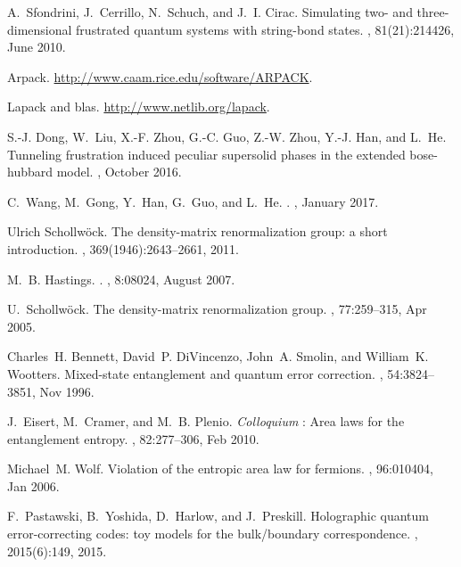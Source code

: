 \documentclass[preprint,3p,times,preprint,showpacs,amsmath,superscriptaddress,floatfix]{elsarticle}
\newcounter{bla}
\begin{document}
\begin{thebibliography}{10}
A.~{Sfondrini}, J.~{Cerrillo}, N.~{Schuch}, and J.~I. {Cirac}.
\newblock Simulating two- and three-dimensional frustrated quantum systems with
  string-bond states.
, 81(21):214426, June 2010.

Arpack.
\newblock \url{http://www.caam.rice.edu/software/ARPACK}.

Lapack and blas.
\newblock \url{http://www.netlib.org/lapack}.

S.-J. {Dong}, W.~{Liu}, X.-F. {Zhou}, G.-C. {Guo}, Z.-W. {Zhou}, Y.-J. {Han},
  and L.~{He}.
\newblock Tunneling frustration induced peculiar supersolid phases in the
  extended bose-hubbard model.
, October 2016.

C.~{Wang}, M.~{Gong}, Y.~{Han}, G.~{Guo}, and L.~{He}.
.
, January 2017.

Ulrich Schollw{\"o}ck.
\newblock The density-matrix renormalization group: a short introduction.
, 369(1946):2643--2661, 2011.

M.~B. {Hastings}.
.
,
  8:08024, August 2007.

U.~Schollw\"ock.
\newblock The density-matrix renormalization group.
, 77:259--315, Apr 2005.

Charles~H. Bennett, David~P. DiVincenzo, John~A. Smolin, and William~K.
  Wootters.
\newblock Mixed-state entanglement and quantum error correction.
, 54:3824--3851, Nov 1996.

J.~Eisert, M.~Cramer, and M.~B. Plenio.
\newblock \textit{Colloquium} : Area laws for the entanglement entropy.
, 82:277--306, Feb 2010.

Michael~M. Wolf.
\newblock Violation of the entropic area law for fermions.
, 96:010404, Jan 2006.

F.~Pastawski, B.~Yoshida, D.~Harlow, and J.~Preskill.
\newblock Holographic quantum error-correcting codes: toy models for the
  bulk/boundary correspondence.
, 2015(6):149, 2015.


\end{thebibliography}
\end{document}
